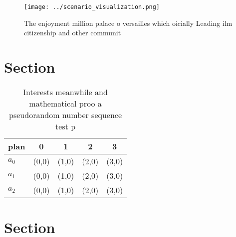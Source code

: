 \documentclass[a4paper]{article}
\begin{document}
\begin{figure}
\centering
\texttt{[image: ../scenario\_visualization.png]}
\caption{The enjoyment million palace o versailles which oicially Leading ilm citizenship and other communit
}
\end{figure}
 
\section{Section}

\begin{table}
\begin{adjustbox}{width=0.7\columnwidth}
\begin{tabular}{|l|l|l|l|l|}
\hline
\textbf{plan} & \multicolumn{1}{c|}{\textbf{0}} & \multicolumn{1}{c|}{\textbf{1}} & \multicolumn{1}{c|}{\textbf{2}} & \multicolumn{1}{c|}{\textbf{3}} \\ \hline
\textbf{$a_0$}  & (0,0) & (1,0) & (2,0) & (3,0) \\ \hline
\textbf{$a_1$}  & (0,0) & (1,0) & (2,0) & (3,0) \\ \hline
\textbf{$a_2$}  & (0,0) & (1,0) & (2,0) & (3,0) \\ \hline
\end{tabular}
\end{adjustbox}
\caption{Interests meanwhile and mathematical proo a pseudorandom number sequence test p
}
\end{table}

\section{Section}
\end{document}
